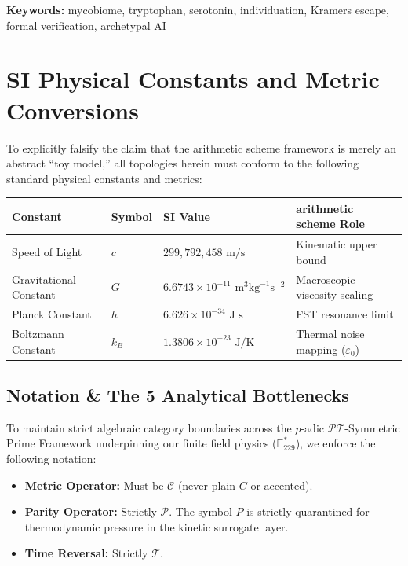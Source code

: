 \medskip\noindent
\textbf{Keywords:} mycobiome, tryptophan, serotonin, individuation,
Kramers escape, formal verification, archetypal AI
\vspace{1em}

\section*{SI Physical Constants and Metric Conversions}
To explicitly falsify the claim that the arithmetic scheme framework is merely an abstract ``toy model,'' all topologies herein must conform to the following standard physical constants and metrics:
\begin{table}[ht]
\centering
\renewcommand{\arraystretch}{1.2}
\begin{tabular}{@{}llll@{}}
\toprule
\textbf{Constant} & \textbf{Symbol} & \textbf{SI Value} & \textbf{arithmetic scheme Role} \\
\midrule
Speed of Light & $c$ & $299,792,458 \text{ m/s}$ & Kinematic upper bound \\
Gravitational Constant & $G$ & $6.6743 \times 10^{-11} \text{ m}^3 \text{kg}^{-1} \text{s}^{-2}$ & Macroscopic viscosity scaling \\
Planck Constant & $h$ & $6.626 \times 10^{-34} \text{ J s}$ & FST resonance limit \\
Boltzmann Constant & $k_B$ & $1.3806 \times 10^{-23} \text{ J/K}$ & Thermal noise mapping ($\varepsilon_0$) \\
\bottomrule
\end{tabular}
\end{table}


\subsection*{Notation \& The 5 Analytical Bottlenecks}
To maintain strict algebraic category boundaries across the $p$-adic $\mathcal{PT}$-Symmetric Prime Framework underpinning our finite field physics ($\mathbb{F}_{229}^*$), we enforce the following notation: 
\begin{itemize}
    \item \textbf{Metric Operator:} Must be $\mathcal{C}$ (never plain $C$ or accented).
    \item \textbf{Parity Operator:} Strictly $\mathcal{P}$. The symbol $P$ is strictly quarantined for thermodynamic pressure in the kinetic surrogate layer. 
    \item \textbf{Time Reversal:} Strictly $\mathcal{T}$.
\end{itemize}

